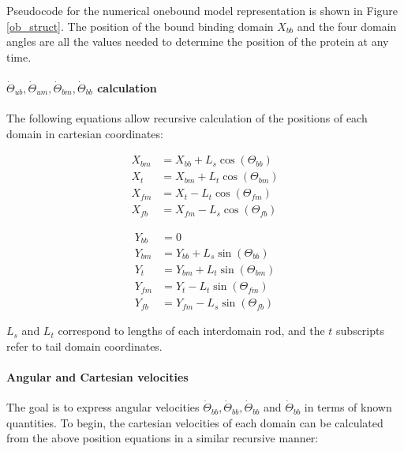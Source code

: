 \documentclass[10pt]{article} %
\begin{document}
Pseudocode for the numerical onebound model representation is shown in Figure \ref{ob_struct}. The position of the bound binding domain $X_{bb}$ and the four domain angles are all the values needed to determine the position of the protein at any time.\\

\paragraph{$\dot{\Theta}_{ub}, \dot{\Theta}_{um}, \dot{\Theta}_{bm}, \dot{\Theta}_{bb}$ calculation}

The following equations allow recursive calculation of the positions of each domain in cartesian coordinates:

\noindent\begin{minipage}{0.49\linewidth}
\begin{align}
  X_{bm} &= X_{bb}+L_{s}\cos(\Theta_{bb}) \\
  X_{t}  &= X_{bm}+L_{t}\cos(\Theta_{bm}) \\
  X_{fm} &= X_{t} - L_{t}\cos(\Theta_{fm}) \\
  X_{fb} &= X_{fm} - L_{s}\cos(\Theta_{fb})
\end{align}
\end{minipage}
\begin{minipage}{0.49\linewidth}
\begin{align}
  Y_{bb} &= 0 \\
  Y_{bm} &= Y_{bb}+L_{s}\sin(\Theta_{bb}) \\
  Y_{t}  &= Y_{bm}+L_{t}\sin(\Theta_{bm}) \\
  Y_{fm} &= Y_{t} - L_{t}\sin(\Theta_{fm}) \\
  Y_{fb} &= Y_{fm} - L_{s}\sin(\Theta_{fb})
\end{align}
\end{minipage}
\vspace{.5cm}

$L_s$ and $L_t$ correspond to lengths of each interdomain rod, and the $t$ subscripts refer to tail domain coordinates.\\

\paragraph{Angular and Cartesian velocities}
The goal is to express angular velocities $\dot{\Theta}_{bb}, \dot{\Theta}_{bb}, \dot{\Theta}_{bb}$ and $\dot{\Theta}_{bb}$ in terms of known quantities. To begin, the cartesian velocities of each domain can be calculated from the above position equations in a similar recursive manner:
\end{document}

